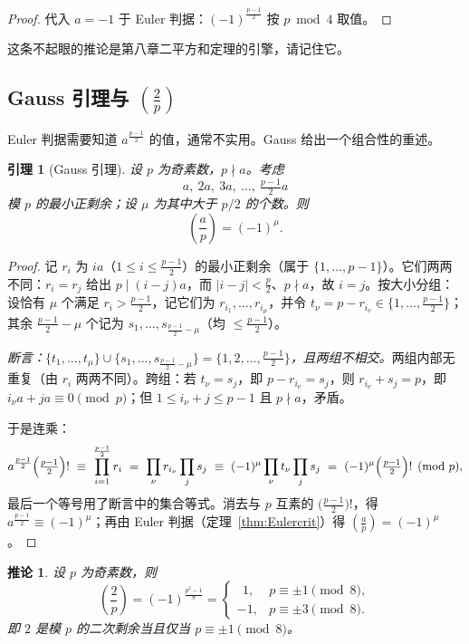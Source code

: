 \documentclass[a4paper,11pt]{ctexart}
\numberwithin{equation}{section}
\theoremstyle{plain}
\newtheorem{lemma}[theorem]{引理}
\newtheorem{corollary}[theorem]{推论}
\theoremstyle{definition}
\theoremstyle{remark}
\newcommand{\leg}[2]{\left(\frac{#1}{#2}\right)}
\begin{document}
\begin{proof}
代入 $a=-1$ 于 Euler 判据：$(-1)^{\frac{p-1}2}$ 按 $p\bmod 4$ 取值。
\end{proof}

这条不起眼的推论是第八章二平方和定理的引擎，请记住它。

\subsection{Gauss 引理与 $\leg{2}{p}$}

Euler 判据需要知道 $a^{\frac{p-1}2}$ 的值，通常不实用。Gauss 给出一个组合性的重述。

\begin{lemma}[Gauss 引理]\label{lem:Gauss}
设 $p$ 为奇素数，$p\nmid a$。考虑
\[
a,\ 2a,\ 3a,\ \dots,\ \tfrac{p-1}{2}a
\]
模 $p$ 的最小正剩余；设 $\mu$ 为其中大于 $p/2$ 的个数。则
\[
\leg{a}{p}=(-1)^{\mu}.
\]
\end{lemma}

\begin{proof}
记 $r_i$ 为 $ia$（$1\le i\le\frac{p-1}2$）的最小正剩余（属于 $\{1,\dots,p-1\}$）。它们两两不同：$r_i=r_j$ 给出 $p\mid(i-j)a$，而 $|i-j|<\frac p2$、$p\nmid a$，故 $i=j$。按大小分组：设恰有 $\mu$ 个满足 $r_i>\frac{p-1}2$，记它们为 $r_{i_1},\dots,r_{i_\mu}$，并令 $t_\nu=p-r_{i_\nu}\in\{1,\dots,\frac{p-1}2\}$；其余 $\frac{p-1}2-\mu$ 个记为 $s_1,\dots,s_{\frac{p-1}2-\mu}$（均 $\le\frac{p-1}2$）。

\emph{断言：$\{t_1,\dots,t_\mu\}\cup\{s_1,\dots,s_{\frac{p-1}2-\mu}\}=\{1,2,\dots,\frac{p-1}2\}$，且两组不相交。}两组内部无重复（由 $r_i$ 两两不同）。跨组：若 $t_\nu=s_j$，即 $p-r_{i_\nu}=s_j$，则 $r_{i_\nu}+s_j=p$，即 $i_\nu a+ja\equiv0\pmod p$；但 $1\le i_\nu+j\le p-1$ 且 $p\nmid a$，矛盾。

于是连乘：
\[
a^{\frac{p-1}{2}}\Bigl(\tfrac{p-1}{2}\Bigr)!\ \equiv\ \prod_{i=1}^{\frac{p-1}2} r_i
\ =\ \prod_{\nu} r_{i_\nu}\prod_{j} s_j\
\equiv\ (-1)^{\mu}\prod_{\nu} t_\nu\prod_{j} s_j\
=\ (-1)^{\mu}\Bigl(\tfrac{p-1}{2}\Bigr)!\pmod p,
\]
最后一个等号用了断言中的集合等式。消去与 $p$ 互素的 $\bigl(\frac{p-1}2\bigr)!$，得 $a^{\frac{p-1}2}\equiv(-1)^{\mu}$；再由 Euler 判据（定理~\ref{thm:Eulercrit}）得 $\leg{a}{p}=(-1)^{\mu}$。
\end{proof}

\begin{corollary}\label{cor:two}
设 $p$ 为奇素数，则
\[
\leg{2}{p}=(-1)^{\frac{p^2-1}{8}}
=\begin{cases}\ \ 1,& p\equiv \pm1 \pmod 8,\\ -1,& p\equiv \pm3 \pmod 8.\end{cases}
\]
即 $2$ 是模 $p$ 的二次剩余当且仅当 $p\equiv \pm1 \pmod 8$。
\end{corollary}
\end{document}
